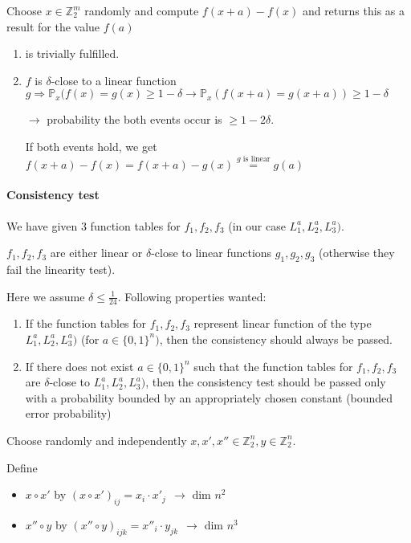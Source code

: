 \documentclass[11pt]{article}
\theoremstyle{definition}
\theoremstyle{definition}
\begin{document}
Choose $ x \in \mathbb{Z}_2^m $ randomly and compute $ f(x + a) - f(x) $ and returns this as a result for the value $ f(a) $

\begin{enumerate}
\item is trivially fulfilled.
\item $ f $ is $ \delta $-close to a linear function $ g \Rightarrow \mathbb{P}_x (f(x) = g(x) \geq 1 - \delta \rightarrow \mathbb{P}_x (f(x + a) = g(x + a)) \geq 1 - \delta $

$ \rightarrow $ probability the both events occur is $ \geq 1 - 2 \delta $.

If both events hold, we get $ f(x + a) - f(x ) = f(x + a) - g(x) \overset{g \text{ is linear}}{=} g(a) $
\end{enumerate}

\paragraph{Consistency test}

We have given 3 function tables for $ f_1, f_2, f_3 $ (in our case $ L_1^a, L_2^a, L_3^a )$.

$ f_1, f_2, f_3 $ are either linear or $ \delta $-close to linear functions $ g_1, g_2, g_3 $ (otherwise they fail the linearity test).

Here we assume $ \delta \leq \frac{1}{24} $. Following properties wanted:

\begin{enumerate}

\item If the function tables for $ f_1, f_2, f_3 $ represent linear function of the type $ L_1^a, L_2^a, L_3^a )$ (for $ a \in \{0, 1\}^n) $, then the consistency should always be passed.
\item If there does not exist $ a \in \{0, 1\}^n $ such that the function tables for $ f_1, f_2, f_3 $ are $ \delta $-close to $ L_1^a, L_2^a, L_3^a )$, then the consistency test should be passed only with a probability bounded by an appropriately chosen constant (bounded error probability)

\end{enumerate}

Choose randomly and independently $ x, x', x'' \in \mathbb{Z}_2^n, y \in \mathbb{Z}_2^n $.

Define
\begin{itemize}
\item $ x \circ x' $ by $(x \circ x')_{ij} = x_i \cdot x'_j ~~\rightarrow $ dim $n^2 $
\item $ x'' \circ y $ by $(x'' \circ y)_{ijk} = x''_i \cdot y_{jk} ~~\rightarrow $ dim $n^3 $
\end{itemize}
\end{document}

